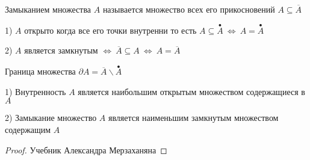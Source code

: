 \begin{define}[Замыкания]
  Замыканием множества $A$ называется множество всех его прикосновений
  $A \subseteq \overline{A}$
\end{define}

\begin{block}[Следствие]
  1) $A$ открыто когда все его точки внутренни то есть
  $A \subseteq \stackrel{\bullet}{A} ~ \Leftrightarrow ~
  A = \stackrel{\bullet}{A}$

  2) $A$ является замкнутым $\Leftrightarrow ~ \overline{A} \subseteq A ~
  \Leftrightarrow ~ A = \overline{A}$
\end{block}

\begin{define}
  Граница множества $\partial A = \overline{A} \backslash \stackrel{\bullet}{A}$
\end{define}

\begin{theorem}
  1) Внутренность $A$ является наибольшим открытым множеством
  содержащиеся в $A$

  2) Замыкание множество $A$ является наименьшим замкнутым множеством
  содержащим $A$
\end{theorem}

\begin{proof}
  Учебник Александра Мерзаханяна
\end{proof}
